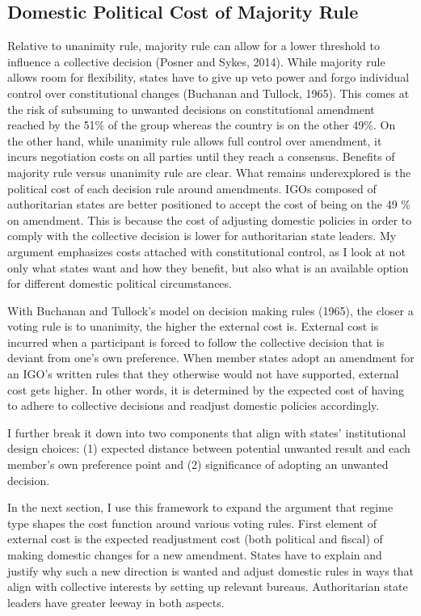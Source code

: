 \documentclass[12pt]{article}
\begin{document}
\subsection{Domestic Political Cost of Majority Rule}

Relative to unanimity rule, majority rule can allow for a lower threshold to influence a collective decision (Posner and Sykes, 2014). While majority rule allows room for flexibility, states have to give up veto power and forgo individual control over constitutional changes (Buchanan and Tullock, 1965). This comes at the risk of subsuming to unwanted decisions on constitutional amendment reached by the 51\% of the group whereas the country is on the other 49\%. On the other hand, while unanimity rule allows full control over amendment, it incurs negotiation costs on all parties until they reach a consensus. Benefits of majority rule versus unanimity rule are clear. What remains underexplored is the political cost of each decision rule around amendments. 
IGOs composed of authoritarian states are better positioned to accept the cost of being on the 49 \% on amendment. This is because the cost of adjusting domestic policies in order to comply with the collective decision is lower for authoritarian state leaders. My argument emphasizes costs attached with constitutional control, as I look at not only what states want and how they benefit, but also what is an available option for different domestic political circumstances.

With Buchanan and Tullock’s model on decision making rules (1965), the closer a voting rule is to unanimity, the higher the external cost is. External cost is incurred when a participant is forced to follow the collective decision that is deviant from one’s own preference. When member states adopt an amendment for an IGO’s written rules that they otherwise would not have supported, external cost gets higher. In other words, it is determined by the expected cost of having to adhere to collective decisions and readjust domestic policies accordingly.

I further break it down into two components that align with states’ institutional design choices: (1) expected distance between potential unwanted result and each member’s own preference point and (2) significance of adopting an unwanted decision.  

In the next section, I use this framework to expand the argument that regime type shapes the cost function around various voting rules. First element of external cost is the expected readjustment cost (both political and fiscal) of making domestic changes for a new amendment. States have to explain and justify why such a new direction is wanted and adjust domestic rules in ways that align with collective interests by setting up relevant bureaus. Authoritarian state leaders have greater leeway in both aspects. 
\end{document}

